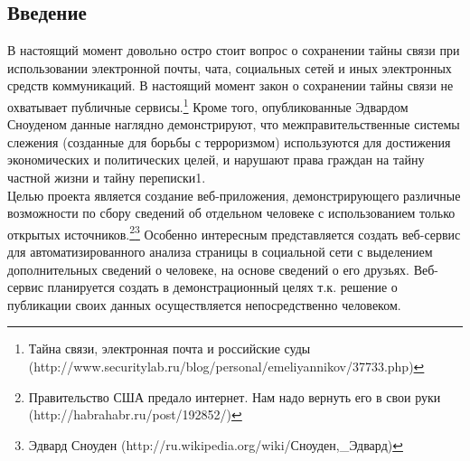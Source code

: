 \begin{chap1} %
\newpage
\section{Введение}
В настоящий момент довольно остро стоит вопрос о сохранении тайны связи при использовании электронной почты, чата, социальных сетей и иных электронных средств коммуникаций. В настоящий момент  закон о сохранении тайны связи не охватывает публичные сервисы.\footnote{ Тайна связи, электронная почта и российские суды (http://www.securitylab.ru/blog/personal/emeliyannikov/37733.php)}
Кроме того, опубликованные Эдвардом Сноуденом данные наглядно демонстрируют, что межправительственные системы слежения (созданные для борьбы с терроризмом) используются для достижения экономических и политических целей, и нарушают права граждан на тайну частной жизни и тайну переписки1.\\

Целью проекта является создание веб-приложения, демонстрирующего различные возможности по сбору сведений об отдельном человеке с использованием только открытых источников.\footnote{Правительство США предало интернет. Нам надо вернуть его в свои руки     (http://habrahabr.ru/post/192852/)}\footnote{Эдвард Сноуден (http://ru.wikipedia.org/wiki/Сноуден,\_Эдвард)} 
Особенно интересным представляется создать веб-сервис для автоматизированного анализа страницы в социальной сети с выделением дополнительных сведений о человеке, на основе сведений о его друзьях. Веб-сервис планируется создать в демонстрационный целях т.к. решение о публикации своих данных осуществляется непосредственно человеком.\\


\end{chap1}
